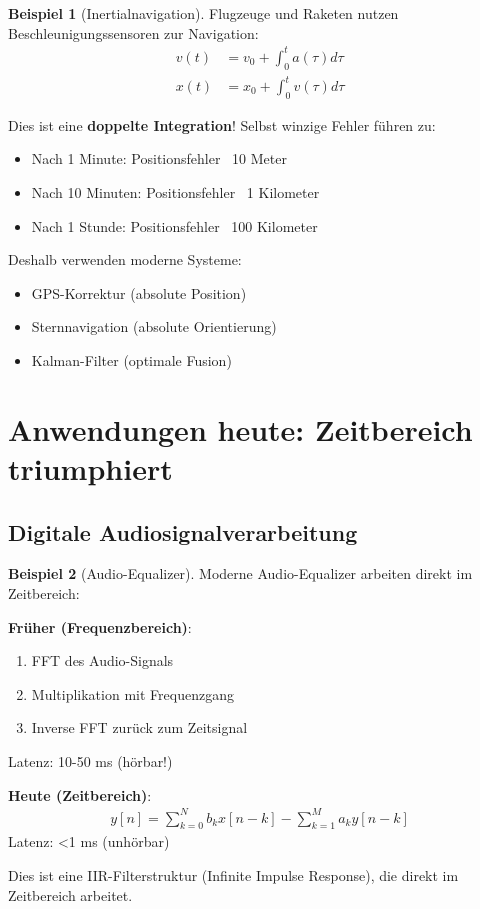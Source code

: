 ﻿\documentclass[a4paper,12pt]{report}
\theoremstyle{definition}
\newtheorem{beispiel}{Beispiel}
\begin{document}
	\begin{beispiel}[Inertialnavigation]
		Flugzeuge und Raketen nutzen Beschleunigungssensoren zur Navigation:
		\begin{align}
			v(t) &= v_0 + \int_0^t a(\tau) d\tau \\
			x(t) &= x_0 + \int_0^t v(\tau) d\tau
		\end{align}
		
		Dies ist eine \textbf{doppelte Integration}! Selbst winzige Fehler führen zu:
		\begin{itemize}
			\item[-] Nach 1 Minute: Positionsfehler ~10 Meter
			\item[-] Nach 10 Minuten: Positionsfehler ~1 Kilometer
			\item[-] Nach 1 Stunde: Positionsfehler ~100 Kilometer
		\end{itemize}
		
		Deshalb verwenden moderne Systeme:
		\begin{itemize}
			\item[-] GPS-Korrektur (absolute Position)
			\item[-] Sternnavigation (absolute Orientierung)
			\item[-] Kalman-Filter (optimale Fusion)
		\end{itemize}
	\end{beispiel}
	
	\section{Anwendungen heute: Zeitbereich triumphiert}
	
	\subsection{Digitale Audiosignalverarbeitung}
	
	\begin{beispiel}[Audio-Equalizer]
		Moderne Audio-Equalizer arbeiten direkt im Zeitbereich:
		
		\textbf{Früher (Frequenzbereich)}:
		\begin{enumerate}
			\item[-] FFT des Audio-Signals
			\item[-] Multiplikation mit Frequenzgang
			\item[-] Inverse FFT zurück zum Zeitsignal
		\end{enumerate}
		Latenz: 10-50 ms (hörbar!)
		
		\textbf{Heute (Zeitbereich)}:
		\begin{align}
			y[n] = \sum_{k=0}^{N} b_k x[n-k] - \sum_{k=1}^{M} a_k y[n-k]
		\end{align}
		Latenz: <1 ms (unhörbar)
		
		Dies ist eine IIR-Filterstruktur (Infinite Impulse Response), die direkt im Zeitbereich arbeitet.
	\end{beispiel}
	
\end{document}
